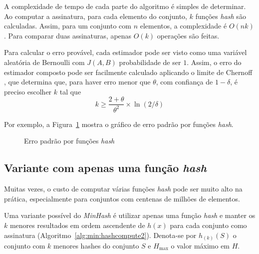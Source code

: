 A complexidade de tempo de cada parte do algoritmo é simples de determinar. Ao computar a assinatura, para cada elemento do conjunto, $k$ funções \emph{hash} são calculadas. Assim, para um conjunto com $n$ elementos, a complexidade é $O(nk)$. Para comparar duas assinaturas, apenas $O(k)$ operações são feitas.

Para calcular o erro provável, cada estimador pode ser visto como uma variável aleatória de Bernoulli com $J(A, B)$ probabilidade de ser $1$. Assim, o erro do estimador composto pode ser facilmente calculado aplicando o limite de Chernoff \cite{cohen2001finding,teixeira2012min}, que determina que, para haver erro menor que $\theta$, com confiança de $1-\delta$, é preciso escolher $k$ tal que 
\[
    k \geq \frac{2+\theta}{\theta^2} \times \ln(2/\delta)
\]

Por exemplo, a Figura~\ref{fig:min:prob} mostra o gráfico de erro padrão por funções \emph{hash}.

\begin{figure}[!htbp]
\centering
{}
\caption{Erro padrão por funções \emph{hash}}
\label{fig:min:prob}
\end{figure}

\subsection{Variante com apenas uma função \emph{hash}}

Muitas vezes, o custo de computar várias funções \emph{hash} pode ser muito alto na prática, especialmente para conjuntos com centenas de milhões de elementos.

Uma variante possível do \emph{MinHash} é utilizar apenas uma função \emph{hash} e manter os $k$ menores resultados em ordem ascendente de $h(x)$ para cada conjunto como assinatura (Algoritmo~\ref{alg:min:hashcompute2}). Denota-se por $h_{(k)}(S)$ o conjunto com $k$ menores hashes do conjunto $S$ e $H_{\max}$ o valor máximo em $H$. 

